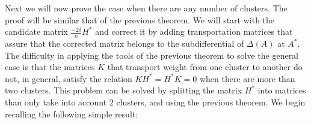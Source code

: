 \documentclass[12pt]{amsart}
\theoremstyle{remark}
\newcommand{\mv}[1]{{\color{red} \sf $\clubsuit\clubsuit\clubsuit$ Mauricio: [#1]}}
\begin{document}


Next we will now prove the case when there are any number of clusters. The proof will be similar that of the previous theorem. We will start with the candidate matrix $\frac{-2\delta}{n}H^*$ and correct it by adding transportation matrices that assure that the corrected matrix belongs to the subdifferential of $\Delta(A)$ at $A^*$.
The difficulty in applying the tools of the previous theorem to solve the general case is that the matrices $K$ that transport weight from one cluster to another do not, in general, satisfy the relation $KH^* = H^*K = 0$ when there are more than two clusters. This problem can be solved by splitting the matrix $H^*$ into matrices than only take into account $2$ clusters, and using the previous theorem.
We begin recalling the following simple result:
\end{document}
